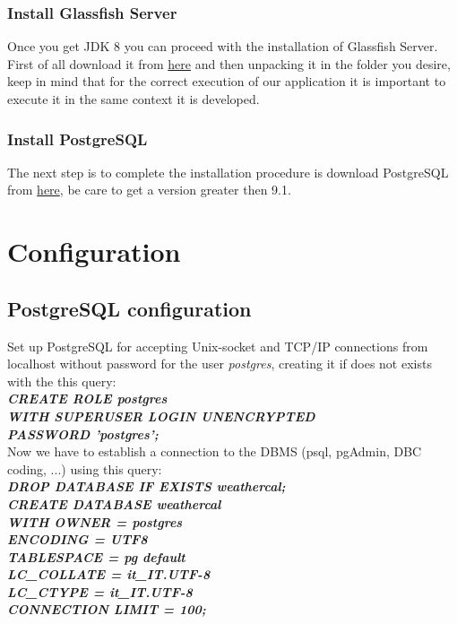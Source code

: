 \subsection{Install Glassfish Server}
Once you get JDK 8 you can proceed with the installation of Glassfish Server. First of all download it from \href{https://glassfish.java.net/download.html}{here} and then unpacking it in the folder you desire, keep in mind that for the correct execution of our application it is important to execute it in the same context it is developed.
\subsection{Install PostgreSQL}
The next step is to complete the installation procedure is  download PostgreSQL from \href{http://www.postgresql.org/download/}{here}, be care to get a version greater then 9.1.
\chapter{Configuration}
\section{PostgreSQL configuration}
 Set up PostgreSQL  for accepting Unix-socket and TCP/IP connections from localhost without password for the user {\it postgres}, creating it if does not exists with the this query:\\
 
{\bf \it CREATE ROLE postgres\\ WITH SUPERUSER LOGIN UNENCRYPTED \\PASSWORD 'postgres';}\\

Now we have to establish a connection to the DBMS (psql, pgAdmin, DBC coding, ...) using this query:\\

{\bf \it DROP DATABASE IF EXISTS weathercal;\\
CREATE DATABASE weathercal\\
  WITH OWNER = postgres\\
       ENCODING = UTF8\\
       TABLESPACE = pg default\\
       LC\_COLLATE = it\_IT.UTF-8\\
       LC\_CTYPE = it\_IT.UTF-8\\
       CONNECTION LIMIT = 100;}\\
       
